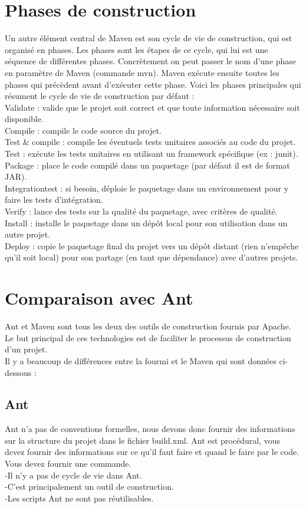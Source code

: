 \documentclass{report}
\begin{document}
\section{Phases de construction  }
Un autre élément central de Maven est son cycle de vie de construction, qui est organisé en phases. Les phases sont les étapes de ce cycle, qui lui est une séquence de différentes phases. Concrètement on peut passer le nom d'une phase en paramètre de Maven (commande mvn). Maven exécute ensuite toutes les phases qui précèdent avant d'exécuter cette phase. Voici les phases principales qui résument le cycle de vie de construction par défaut : \\
Validate : valide que le projet soit correct et que toute information nécessaire soit disponible. \\
Compile : compile le code source du projet.\\
Test & compile : compile les éventuels tests unitaires associés au code du projet. \\
Test : exécute les tests unitaires en utilisant un framework spécifique (ex : junit).\\
Package : place le code compilé dans un paquetage (par défaut il est de format JAR).\\
Integrationtest : si besoin, déploie le paquetage dans un environnement pour y faire les tests d’intégration.\\ 
Verify : lance des tests sur la qualité du paquetage, avec critères de qualité. \\
Install : installe le paquetage dans un dépôt local pour son utilisation dans un autre projet.\\
Deploy : copie le paquetage final du projet vers un dépôt distant (rien n'empêche qu'il soit local) pour son partage (en tant que dépendance) avec d'autres projets.

\section{Comparaison avec Ant }
Ant et Maven sont tous les deux des outils de construction fournis par Apache. Le but principal de ces technologies est de faciliter le processus de construction d'un projet.\\
Il y a beaucoup de différences entre la fourmi et le Maven qui sont données ci-dessous :
\newpage
\subsection{Ant}
Ant n'a pas de conventions formelles, nous devons donc fournir des informations sur la structure du projet dans le fichier build.xml.
Ant est procédural, vous devez fournir des informations sur ce qu'il faut faire et quand le faire par le code. Vous devez fournir une commande.\\
-Il n'y a pas de cycle de vie dans Ant.\\
-C'est principalement un outil de construction.\\
-Les scripts Ant ne sont pas réutilisables.\\
\end{document}
